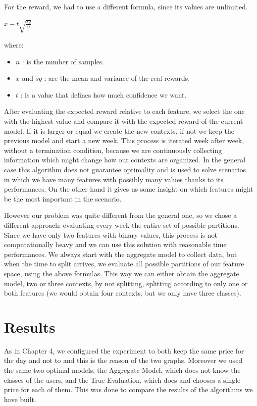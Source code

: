 	For the reward, we had to use a different formula, since its values are unlimited.

\begin{center}$x - t \sqrt{\frac{sq} {n}}$\end{center}
where:
\begin{itemize}
	\item $n$ : is the number of samples.
	\item $x$ and $sq$ : are the mean and variance of the real rewards.
	\item $t$ : is a value that defines how much confidence we want.
\end{itemize}

After evaluating the expected reward relative to each feature, we select the one with the highest value and compare it with the expected reward of the current model.
If it is larger or equal we create the new contexts, if not we keep the previous model and start a new week.
This process is iterated week after week, without a termination condition, because we are continuously collecting information which might change how our contexts are organized.
In the general case this algorithm does not guarantee optimality and is used to solve scenarios in which we have many features with possibly many values thanks to its performances.
On the other hand it gives us some insight on which features might be the most important in the scenario.

However our problem was quite different from the general one, so we chose a different approach: evaluating every week the entire set of possible partitions.
Since we have only two features with binary values, this process is not computationally heavy and we can use this solution with reasonable time performances.
We always start with the aggregate model to collect data, but when the time to split arrives, we evaluate all possible partitions of our feature space, using the above formulas.
This way we can either obtain the aggregate model, two or three contexts, by not splitting, splitting according to only one or both features (we would obtain four contexts, but we only have three classes).

\section{Results}\label{sec:our-result}

As in Chapter 4, we configured the experiment to both keep the same price for the day and not to and this is the reason of the two graphs.
Moreover we used the same two optimal models, the Aggregate Model, which does not know the classes of the users, and the True Evaluation, which does and chooses a single price for each of them.
This was done to compare the results of the algorithms we have built.

